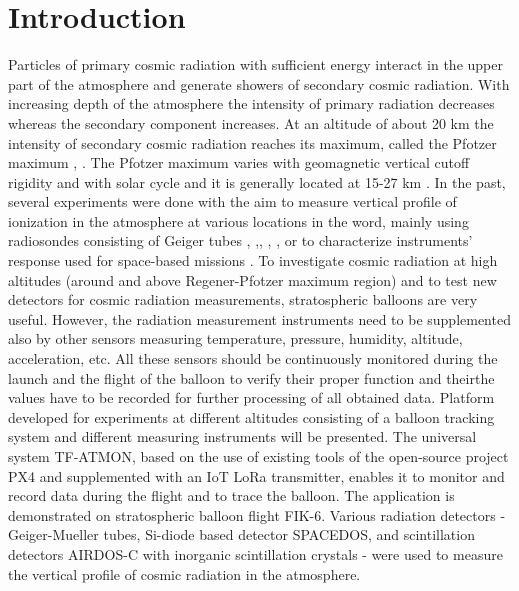 \documentclass{Rpd}
\begin{document}
\maketitle


\section{Introduction}

Particles of primary cosmic radiation with sufficient energy interact in the upper part of the atmosphere and generate showers of secondary cosmic radiation. With increasing depth of the atmosphere the intensity of primary radiation decreases whereas the secondary component increases. At an altitude of about 20 km the intensity of secondary cosmic radiation reaches its maximum, called the Pfotzer maximum \cite{Regener}, \cite{Pfotzer}. The Pfotzer maximum varies with geomagnetic vertical cutoff rigidity and with solar cycle and it is generally located at 15-27 km \cite{Bazilevskaya}.
In the past, several experiments were done with the aim to measure vertical profile of ionization in the atmosphere at various locations in the word, mainly using radiosondes consisting of Geiger tubes \cite{Bazilevskaya}, \cite{ionization_profile},\cite{Vertical_profile_measurements}, \cite{cosmic_ray_intensity}, \cite{Radioactivity_atmosphere}, or to characterize instruments’ response used for space-based missions \cite{Lawrence} \cite{Mukherjee} \cite{Timepix}.
To investigate cosmic radiation at high altitudes (around and above Regener-Pfotzer maximum region) and to test new detectors for cosmic radiation measurements, stratospheric balloons are very useful.
However, the radiation measurement instruments need to be supplemented also by other sensors measuring temperature, pressure, humidity, altitude, acceleration, etc.  All these sensors should be continuously monitored during the launch and the flight of the balloon to verify their proper function and theirthe values have to be recorded for further processing of all obtained data.
Platform developed for experiments at different altitudes consisting of a balloon tracking system and different measuring instruments will be presented. The universal system TF-ATMON, based on the use of existing tools of the open-source project PX4 and supplemented with an IoT LoRa transmitter, enables it to monitor and record data during the flight and to trace the balloon. The application is demonstrated on stratospheric balloon flight FIK-6. Various radiation detectors - Geiger-Mueller tubes, Si-diode based detector SPACEDOS, and scintillation detectors AIRDOS-C with inorganic scintillation crystals - were used to measure the vertical profile of cosmic radiation in the atmosphere.
\end{document}
